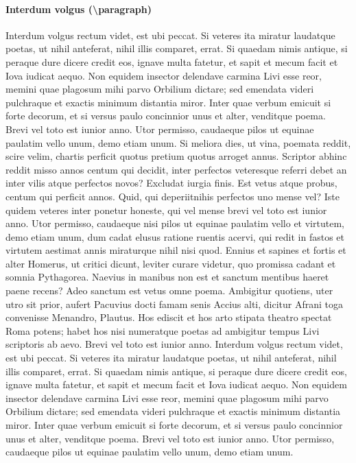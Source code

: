 \documentclass[article,colorback,accentcolor=tud4c]{tudreport}
\begin{document}
  \paragraph{Interdum volgus (\textbackslash paragraph)}

    Interdum volgus rectum videt, est ubi peccat. Si veteres ita miratur laudatque poetas, ut nihil anteferat, nihil illis comparet, errat.  Si quaedam nimis antique, si peraque dure dicere credit eos, ignave multa fatetur, et sapit et mecum facit et Iova iudicat aequo. Non equidem insector delendave carmina Livi esse reor, memini quae plagosum mihi parvo Orbilium dictare; sed emendata videri pulchraque et exactis minimum distantia miror. Inter quae verbum emicuit si forte decorum, et si versus paulo concinnior unus et alter, venditque poema. Brevi vel toto est iunior anno. Utor permisso, caudaeque pilos ut equinae paulatim vello unum, demo etiam unum. Si meliora dies, ut vina, poemata reddit, scire velim, chartis perficit quotus pretium quotus arroget annus. Scriptor abhinc reddit misso annos centum qui decidit, inter perfectos veteresque referri debet an inter vilis atque perfectos novos? Excludat iurgia finis. Est vetus atque probus, centum qui perficit annos. Quid, qui deperiitnihis perfectos uno mense vel? Iste quidem veteres inter ponetur honeste, qui vel mense brevi vel toto est iunior anno.
    Utor permisso, caudaeque nisi pilos ut equinae paulatim vello et virtutem, demo etiam unum, dum cadat elusus ratione ruentis acervi, qui redit in fastos et virtutem aestimat annis miraturque nihil nisi quod. Ennius et sapines et fortis et alter Homerus, ut critici dicunt, leviter curare videtur, quo promissa cadant et somnia Pythagorea.  Naevius in manibus non est et sanctum mentibus haeret paene recens? 
    Adeo sanctum est vetus omne poema. Ambigitur quotiens, uter utro sit prior, aufert Pacuvius docti famam senis Accius alti, dicitur Afrani toga convenisse Menandro, Plautus. Hos ediscit et hos arto stipata theatro spectat Roma potens; habet hos nisi numeratque poetas ad ambigitur tempus Livi scriptoris ab aevo. Brevi vel toto est iunior anno. Interdum volgus rectum videt, est ubi peccat. Si veteres ita miratur laudatque poetas, ut nihil anteferat, nihil illis comparet, errat.  Si quaedam nimis antique, si peraque dure dicere credit eos, ignave multa fatetur, et sapit et mecum facit et Iova iudicat aequo. Non equidem insector delendave carmina Livi esse reor, memini quae plagosum mihi parvo Orbilium dictare; sed emendata videri pulchraque et exactis minimum distantia miror. Inter quae verbum emicuit si forte decorum, et si versus paulo concinnior unus et alter, venditque poema. Brevi vel toto est iunior anno. Utor permisso, caudaeque pilos ut equinae paulatim vello unum, demo etiam unum.
\end{document}
